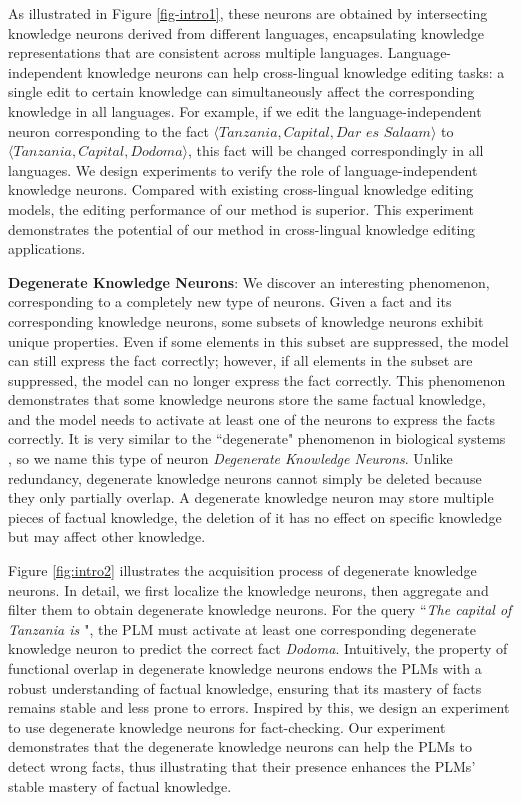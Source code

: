 \documentclass[]{article}
\begin{document}
As illustrated in Figure \ref{fig-intro1}, these neurons are obtained by intersecting knowledge neurons derived from different languages, encapsulating knowledge representations that are consistent across multiple languages. Language-independent knowledge neurons can help cross-lingual knowledge editing tasks: a single edit to certain knowledge can simultaneously affect the corresponding knowledge in all languages. For example, if we edit the language-independent neuron corresponding to the fact $\langle  \textit{Tanzania}, \textit{Capital}, \textit{Dar es Salaam} \rangle$ to $\langle \textit{Tanzania}, \textit{Capital}, \textit{Dodoma} \rangle$, this fact will be changed correspondingly in all languages.
We design experiments to verify the role of language-independent knowledge neurons. Compared with existing cross-lingual knowledge editing models, the editing performance of our method is superior. This experiment demonstrates the potential of our method in cross-lingual knowledge editing applications.

\textbf{Degenerate Knowledge Neurons}: We discover an interesting phenomenon, corresponding to a completely new type of neurons. Given a fact and its corresponding knowledge neurons, some subsets of knowledge neurons exhibit unique properties. Even if some elements in this subset are suppressed, the model can still express the fact correctly; however, if all elements in the subset are suppressed, the model can no longer express the fact correctly. This phenomenon demonstrates that some knowledge neurons store the same factual knowledge, and the model needs to activate at least one of the neurons to express the facts correctly. It is very similar to the ``degenerate" phenomenon in biological systems \cite{degenerate_biological,mason2015degeneracy}, so we name this type of neuron \textit{Degenerate Knowledge Neurons}.
Unlike redundancy, degenerate knowledge neurons cannot simply be deleted because they only partially overlap. A degenerate knowledge neuron may store multiple pieces of factual knowledge, the deletion of it has no effect on specific knowledge but may affect other knowledge.

Figure \ref{fig:intro2} illustrates the acquisition process of degenerate knowledge neurons. In detail, we first localize the knowledge neurons, then aggregate and filter them to obtain degenerate knowledge neurons. For the query ``\textit{The capital of Tanzania is \underline{\hspace{0.4cm}}}", the PLM must activate at least one corresponding degenerate knowledge neuron to predict the correct fact \textit{Dodoma}.
Intuitively, the property of functional overlap in degenerate knowledge neurons endows the PLMs with a robust understanding of factual knowledge, ensuring that its mastery of facts remains stable and less prone to errors.
Inspired by this, we design an experiment to use degenerate knowledge neurons for fact-checking. Our experiment demonstrates that the degenerate knowledge neurons can help the PLMs to detect wrong facts, thus illustrating that their presence enhances the PLMs' stable mastery of factual knowledge.
\end{document}
